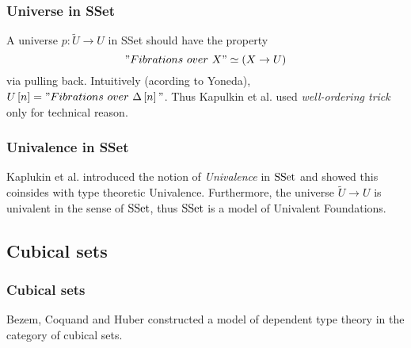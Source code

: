 \documentclass[dvipdfmx]{beamer}
\begin{document}
\begin{frame}
  \frametitle{Universe in {\rm SSet}}
  A universe $p : \tilde{U} \to U$ in {\rm SSet} should have the property
  \[
    "Fibrations \ over \ X" \simeq \left( X \to U \right)
  \]
  via pulling back.
  Intuitively (acording to Yoneda),
  $U \left[ n \right] =
  "Fibrations \ over \ \Delta \left[ n \right]"$.
  Thus Kapulkin et al. used {\it well-ordering trick}
  only for technical reason.
\end{frame}

\begin{frame}
  \frametitle{Univalence in {\rm SSet}}
  Kaplukin et al. introduced the notion of
  {\it Univalence} in ${\rm SSet}$ and
  showed this coinsides with
  type theoretic Univalence.
  Furthermore, the universe $\tilde{U} \to U$
  is univalent in the sense of ${\rm SSet}$,
  thus ${\rm SSet}$ is a model of
  Univalent Foundations.
\end{frame}

\subsection*{Cubical sets}

\begin{frame}
  \frametitle{Cubical sets}
  Bezem, Coquand and Huber constructed
  a model of dependent type theory
  in the category of cubical sets.
  \cite{bezem_et_al:LIPIcs:2014:4628}
\end{frame}
\end{document}
